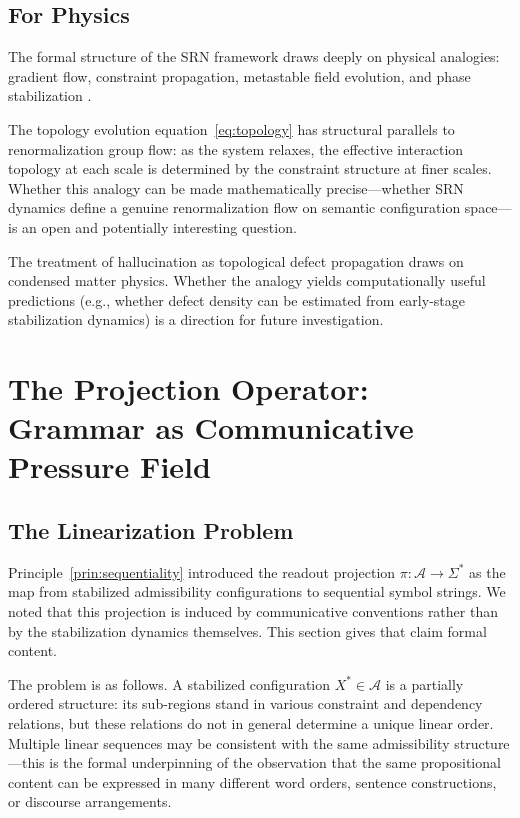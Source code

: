 \documentclass[11pt, a4paper]{article}
\theoremstyle{srn}
\theoremstyle{srnremark}
\newcommand{\Aspace}{\mathcal{A}}           %
\begin{document}
\subsection{For Physics}

The formal structure of the SRN framework draws deeply on physical
analogies: gradient flow, constraint propagation, metastable field
evolution, and phase stabilization
\citep{parisi1988statistical, wilson1974renormalization,
barbour2020janus}.

The topology evolution equation~\eqref{eq:topology} has structural
parallels to renormalization group flow: as the system relaxes, the
effective interaction topology at each scale is determined by the
constraint structure at finer scales.
Whether this analogy can be made mathematically precise---whether
SRN dynamics define a genuine renormalization flow on semantic
configuration space---is an open and potentially interesting question.

The treatment of hallucination as topological defect propagation draws
on condensed matter physics.
Whether the analogy yields computationally useful predictions (e.g.,
whether defect density can be estimated from early-stage stabilization
dynamics) is a direction for future investigation.


\section{The Projection Operator: Grammar as Communicative Pressure Field}
\label{sec:projection}

\subsection{The Linearization Problem}

Principle~\ref{prin:sequentiality} introduced the readout projection
$\pi : \Aspace \to \Sigma^*$ as the map from stabilized admissibility
configurations to sequential symbol strings.
We noted that this projection is induced by communicative conventions
rather than by the stabilization dynamics themselves.
This section gives that claim formal content.

The problem is as follows.
A stabilized configuration $X^* \in \Aspace$ is a partially ordered
structure: its sub-regions stand in various constraint and dependency
relations, but these relations do not in general determine a unique
linear order.
Multiple linear sequences may be consistent with the same admissibility
structure---this is the formal underpinning of the observation that
the same propositional content can be expressed in many different word
orders, sentence constructions, or discourse arrangements.
\end{document}

